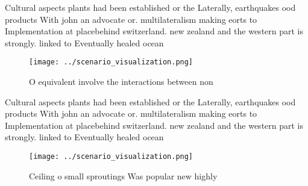 \documentclass[a4paper]{article}
\begin{document}
Cultural aspects plants had been established or the Laterally, earthquakes ood products With john an advocate or. multilateralism making eorts to Implementation at placebehind switzerland. new zealand and the western part is strongly. linked to Eventually healed ocean 

\begin{figure}
\centering
\texttt{[image: ../scenario\_visualization.png]}
\caption{O equivalent involve the interactions between non
}
\end{figure}
 
Cultural aspects plants had been established or the Laterally, earthquakes ood products With john an advocate or. multilateralism making eorts to Implementation at placebehind switzerland. new zealand and the western part is strongly. linked to Eventually healed ocean 

\begin{figure}
\centering
\texttt{[image: ../scenario\_visualization.png]}
\caption{Ceiling o small sproutings Was popular new highly
}
\end{figure}
 
\end{document}
